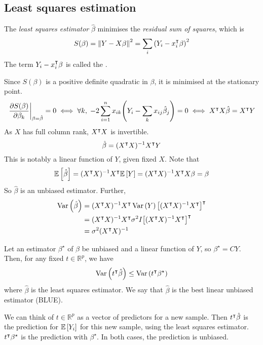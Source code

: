 \subsection{Least squares estimation}
\begin{definition}
	The \textit{least squares estimator} \( \hat \beta \) minimises the \textit{residual sum of squares}, which is
	\[ S(\beta) = \norm{Y-X\beta}^2 = \sum_i \qty(Y_i - x_i^\intercal \beta)^2 \]
	The term \( Y_i - x_i^\intercal \beta \) is called the .
\end{definition}
Since \( S(\beta) \) is a positive definite quadratic in \( \beta \), it is minimised at the stationary point.
\[ \eval{\pdv{S(\beta)}{\beta_k}}_{\beta = \hat \beta} = 0 \iff \forall k,\;-2\sum_{i=1}^n x_{ik} \qty(Y_i - \sum_k x_{ij} \hat \beta_j) = 0 \iff X^\transpose X \hat \beta = X^\transpose Y \]
As \( X \) has full column rank, \( X^\intercal X \) is invertible.
\[ \hat \beta = (X^\intercal X)^{-1} X^\intercal Y \]
This is notably a linear function of \( Y \), given fixed \( X \).
Note that
\[ \mathbb{E}\left[{\hat \beta}\right] = (X^\intercal X)^{-1} X^\intercal \mathbb{E}\left[{Y}\right] = (X^\intercal X)^{-1} X^\intercal X\beta = \beta \]
So \( \hat \beta \) is an unbiased estimator.
Further,
\begin{align*}
	\operatorname{Var}\left({\hat \beta}\right) &= (X^\intercal X)^{-1} X^\intercal \operatorname{Var}\left({Y}\right) \qty[(X^\intercal X)^{-1} X^\intercal]^\intercal \\
	&= (X^\intercal X)^{-1} X^\intercal \sigma^2 I \qty[(X^\intercal X)^{-1} X^\intercal]^\intercal \\
	&= \sigma^2 (X^\intercal X)^{-1}
\end{align*}
\begin{theorem}
	Let an estimator \( \beta^\star \) of \( \beta \) be unbiased and a linear function of \( Y \), so \( \beta^\star = CY \).
	Then, for any fixed \( t \in \mathbb R^p \), we have
	\[ \operatorname{Var}\left({t^\intercal \hat \beta}\right) \leq \operatorname{Var}\left({t^\intercal \beta^\star}\right) \]
	where \( \hat \beta \) is the least squares estimator.
	We say that \( \hat \beta \) is the best linear unbiased estimator (BLUE).
\end{theorem}
\begin{remark}
	We can think of \( t \in \mathbb R^p \) as a vector of predictors for a new sample.
	Then \( t^\intercal \hat \beta \) is the prediction for \( \mathbb{E}\left[{Y_i}\right] \) for this new sample, using the least squares estimator.
	\( t^\intercal \beta^\star \) is the prediction with \( \beta^\star \).
	In both cases, the prediction is unbiased.
\end{remark}

